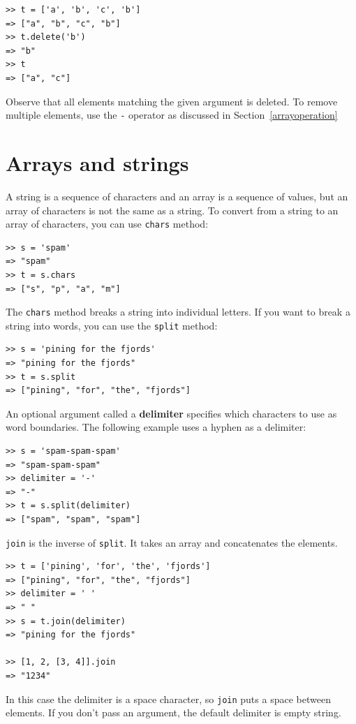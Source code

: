 \documentclass[10pt]{book}
\begin{document}
\begin{verbatim}
>> t = ['a', 'b', 'c', 'b']
=> ["a", "b", "c", "b"]
>> t.delete('b')
=> "b"
>> t
=> ["a", "c"]
\end{verbatim}
%
Observe that all elements matching the given argument is deleted.
To remove multiple elements, use the {\tt -} operator as discussed in Section~\ref{arrayoperation}



\section{Arrays and strings}

A string is a sequence of characters and an array is a sequence
of values, but an array of characters is not the same as a
string.  To convert from a string to an array of characters,
you can use {\tt chars} method:

\begin{verbatim}
>> s = 'spam'
=> "spam"
>> t = s.chars
=> ["s", "p", "a", "m"]
\end{verbatim}
%

The {\tt chars} method breaks a string into individual letters.  If
you want to break a string into words, you can use the {\tt split}
method:

\begin{verbatim}
>> s = 'pining for the fjords'
=> "pining for the fjords"
>> t = s.split
=> ["pining", "for", "the", "fjords"]
\end{verbatim}
%
An optional argument called a {\bf delimiter} specifies which
characters to use as word boundaries.
The following example
uses a hyphen as a delimiter:

\begin{verbatim}
>> s = 'spam-spam-spam'
=> "spam-spam-spam"
>> delimiter = '-'
=> "-"
>> t = s.split(delimiter)
=> ["spam", "spam", "spam"]
\end{verbatim}
%
{\tt join} is the inverse of {\tt split}.  It
takes an array and concatenates the elements.

\begin{verbatim}
>> t = ['pining', 'for', 'the', 'fjords']
=> ["pining", "for", "the", "fjords"]
>> delimiter = ' '
=> " "
>> s = t.join(delimiter)
=> "pining for the fjords"

>> [1, 2, [3, 4]].join
=> "1234"
\end{verbatim}
%
In this case the delimiter is a space character, so
{\tt join} puts a space between elements.  If you don't
pass an argument, the default delimiter is empty string.
\end{document}
